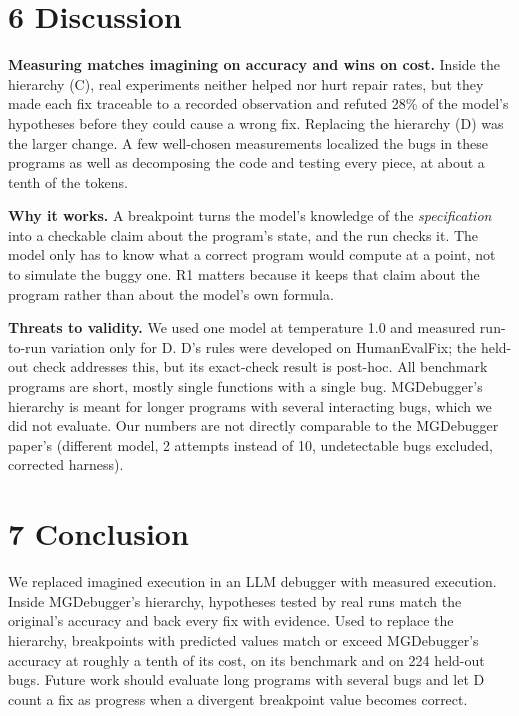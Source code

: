 \documentclass[
  10pt,
  twocolumn]{article}
\begin{document}
\hypertarget{discussion}{%
\section{6 Discussion}\label{discussion}}

\textbf{Measuring matches imagining on accuracy and wins on cost.}
Inside the hierarchy (C), real experiments neither helped nor hurt
repair rates, but they made each fix traceable to a recorded observation
and refuted 28\% of the model's hypotheses before they could cause a
wrong fix. Replacing the hierarchy (D) was the larger change. A few
well-chosen measurements localized the bugs in these programs as well as
decomposing the code and testing every piece, at about a tenth of the
tokens.

\textbf{Why it works.} A breakpoint turns the model's knowledge of the
\emph{specification} into a checkable claim about the program's state,
and the run checks it. The model only has to know what a correct program
would compute at a point, not to simulate the buggy one. R1 matters
because it keeps that claim about the program rather than about the
model's own formula.

\textbf{Threats to validity.} We used one model at temperature 1.0 and
measured run-to-run variation only for D. D's rules were developed on
HumanEvalFix; the held-out check addresses this, but its exact-check
result is post-hoc. All benchmark programs are short, mostly single
functions with a single bug. MGDebugger's hierarchy is meant for longer
programs with several interacting bugs, which we did not evaluate. Our
numbers are not directly comparable to the MGDebugger paper's (different
model, 2 attempts instead of 10, undetectable bugs excluded, corrected
harness).

\hypertarget{conclusion}{%
\section{7 Conclusion}\label{conclusion}}

We replaced imagined execution in an LLM debugger with measured
execution. Inside MGDebugger's hierarchy, hypotheses tested by real runs
match the original's accuracy and back every fix with evidence. Used to
replace the hierarchy, breakpoints with predicted values match or exceed
MGDebugger's accuracy at roughly a tenth of its cost, on its benchmark
and on 224 held-out bugs. Future work should evaluate long programs with
several bugs and let D count a fix as progress when a divergent
breakpoint value becomes correct.
\end{document}
